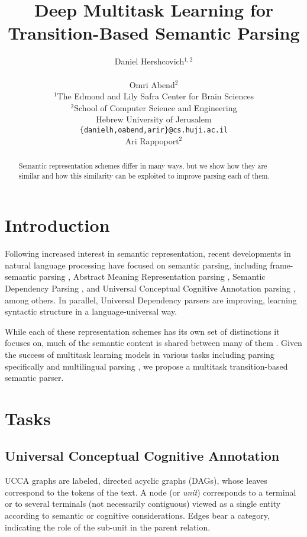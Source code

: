 \documentclass[11pt,a4paper]{article}
\title{Deep Multitask Learning for Transition-Based Semantic Parsing}
\author{Daniel Hershcovich$^{1,2}$ \\
  \\\And
  Omri Abend$^2$ \\
  $^1$The Edmond and Lily Safra Center for Brain Sciences \\
  $^2$School of Computer Science and Engineering \\
  Hebrew University of Jerusalem \\
  \texttt{\{danielh,oabend,arir\}@cs.huji.ac.il}
  \\\And
  Ari Rappoport$^2$
}
\date{}
\begin{document}
\maketitle
\begin{abstract}
  Semantic representation schemes differ in many ways, but we show
  how they are similar and how this similarity can be exploited to
  improve parsing each of them.
\end{abstract}

\section{Introduction}\label{sec:introduction}

Following increased interest in semantic representation,
recent developments in natural language processing have focused on semantic parsing,
including frame-semantic parsing \cite{gildea2002automatic,swayamdipta2017frame,ringgaard2017sling},
Abstract Meaning Representation parsing \cite{damonte-17,11099},
Semantic Dependency Parsing \cite{P17-1186}, and
Universal Conceptual Cognitive Annotation parsing \cite{hershcovich2017a}, among others.
In parallel, Universal Dependency parsers \cite{dozat2016deep} are improving,
learning syntactic structure in a language-universal way.

While each of these representation schemes has its own set of distinctions it focuses on,
much of the semantic content is shared between many of them \cite{abend2017the}.
Given the success of multitask learning models in various tasks
\cite{luong2015multi,ruder2017overview}
including parsing specifically
\cite{Zhang2016StackpropagationIR,P17-1186,swayamdipta2017frame,guo2016exploiting}
and multilingual parsing \cite{TACL892},
we propose a multitask transition-based semantic parser.


\section{Tasks}

\subsection{Universal Conceptual Cognitive Annotation}

UCCA graphs are labeled, directed acyclic graphs (DAGs),
whose leaves correspond to the tokens of
the text. A node (or {\it unit}) corresponds to a terminal or
to several terminals (not necessarily contiguous) viewed as a
single entity according to semantic or cognitive considerations.
Edges bear a category, indicating the role of the sub-unit in the parent relation.
\end{document}
